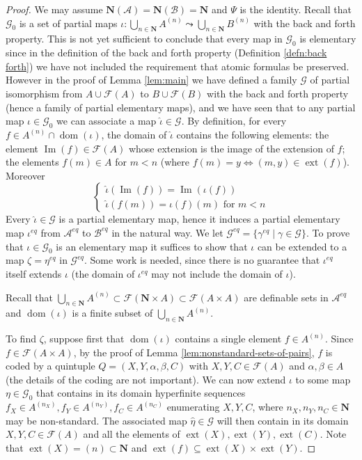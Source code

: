 \documentclass{amsart}
\newcommand{\ca}{\mathcal}
\newcommand{\dom}{\operatorname{dom}}
\newcommand{\img}{\operatorname{Im}}
\theoremstyle{plain}
\theoremstyle{definition}
\newcommand{\F}{\mathcal{F}}
\newcommand{\ext}[1]{\operatorname{ext}(#1)}
\newcommand{\hn}{\mathbf N}
\newcommand{\pto}{\leadsto} %
\begin{document}
\begin{proof} 
We may assume $\hn (\ca A) = \hn(\ca B) = \hn$ and $\Psi$ is the identity. Recall that $\ca G_0$ is a set of partial maps $\iota : \bigcup_{n \in \hn} A^{(n)} \pto \bigcup_{n\in \hn} B^{(n)}$ with the back and forth property. 
This is not yet sufficient to conclude that every map in $\ca G_0$ is elementary since in the definition of the back and forth property (Definition \ref{defn:back forth}) we have not included the requirement that atomic formulas be preserved. However in the proof of Lemma \ref{lem:main} we have defined a family $\ca G$ of partial isomorphism from $A\cup \F(A)$ to $B \cup \F(B)$ with the back and forth property (hence a family of partial elementary maps), and we have seen that to any partial map $\iota\in \ca G_0$ we can associate a map $\hat \iota \in \ca G$. By definition, for every $f\in A^{(n)}\cap \dom(\iota)$, the domain of $\hat \iota$ contains the following elements: the element $\img(f)\in \F(A)$ whose extension is the image of the extension of $f$; the elements $f(m) \in A$ for $m<n$ (where $f(m) = y \iff (m,y) \in \ext f$). Moreover
$$
\begin{cases}
\hat \iota (\img(f)) = \img (\iota(f))\\
\hat \iota (f(m)) = \iota (f) (m) \text{ for } m<n
\end{cases}
$$
Every $\hat \iota \in \ca G$ is a partial elementary map, hence it induces a partial elementary map $\iota^{eq}$ from $\ca A^{eq}$ to $\ca B^{eq}$ in the natural way. We let $\ca G^{eq} = \{\gamma^{eq} \mid \gamma \in \ca G\}$. To prove that $\iota \in \ca G_0$ is an elementary map it suffices to show that $\iota$ can be extended to a map $\zeta = \eta^{eq}$ in $\ca G^{eq}$. Some work is needed, since there is no guarantee that $\iota^{eq}$ itself extends $\iota$ (the domain of $\iota^{eq}$ may not include the domain of $\iota$). 

Recall that $\bigcup_{n\in \hn} A^{(n)} \subset \F(\hn \times A) \subset \F(A\times A)$ are definable sets in $\ca A^{eq}$ and $\dom(\iota)$ is a finite subset of $\bigcup_{n\in \hn} A^{(n)}$. 

To find $\zeta$, suppose first that $\dom(\iota)$ contains a single element $f\in A^{(n)}$. Since $f\in \F(A\times A)$, by the proof of Lemma \ref{lem:nonstandard-sets-of-pairs}, $f$ is coded by a quintuple $Q = (X,Y,\alpha, \beta, C)$ with $X,Y,C\in \F(A)$ and $\alpha, \beta\in A$  (the details of the coding are not important). We can now extend $\iota$ to some map $\eta\in \ca G_0$ that contains in its domain hyperfinite sequences $f_X\in A^{(n_X)}, f_Y\in A^{(n_Y)}, f_C\in A^{(n_C)}$ enumerating $X,Y,C$, where $n_X, n_Y, n_C\in \hn$ may be non-standard. The associated map $\hat \eta\in \ca G$ will then contain in its domain $X,Y,C\in \F(A)$ and all the elements of $\ext X, \ext Y, \ext C$. Note that $\ext X = (n) \subset \hn$ and $\ext f \subseteq \ext X\times \ext Y$.  


\end{proof}
\end{document}
